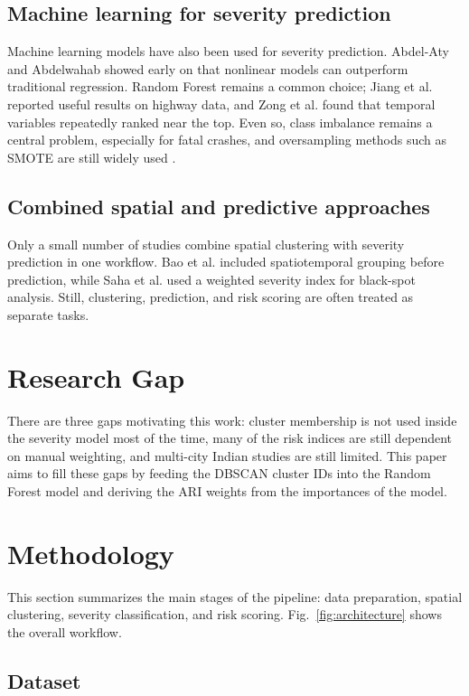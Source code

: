 \documentclass[conference]{IEEEtran}
\begin{document}
\subsection{Machine learning for severity prediction}

Machine learning models have also been used for severity prediction. Abdel-Aty and Abdelwahab \cite{b9} showed early on that nonlinear models can outperform traditional regression. Random Forest remains a common choice; Jiang et al. \cite{b10} reported useful results on highway data, and Zong et al. \cite{b11} found that temporal variables repeatedly ranked near the top. Even so, class imbalance remains a central problem, especially for fatal crashes, and oversampling methods such as SMOTE are still widely used \cite{b14}.

\subsection{Combined spatial and predictive approaches}

Only a small number of studies combine spatial clustering with severity prediction in one workflow. Bao et al. \cite{b16} included spatiotemporal grouping before prediction, while Saha et al. \cite{b18} used a weighted severity index for black-spot analysis. Still, clustering, prediction, and risk scoring are often treated as separate tasks.

\section{Research Gap}

There are three gaps motivating this work: cluster membership is not used inside the severity model most of the time, many of the risk indices are still dependent on manual weighting, and multi-city Indian studies are still limited. This paper aims to fill these gaps by feeding the DBSCAN cluster IDs into the Random Forest model and deriving the ARI weights from the importances of the model.

\section{Methodology}

This section summarizes the main stages of the pipeline: data preparation, spatial clustering, severity classification, and risk scoring. Fig.~\ref{fig:architecture} shows the overall workflow.

\subsection{Dataset}
\end{document}
